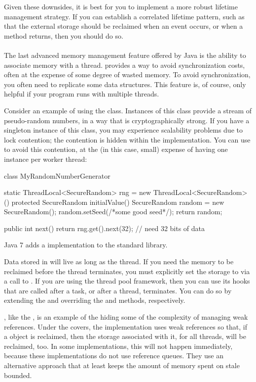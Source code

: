 Given these downsides, it is best for you to implement a more robust lifetime
management strategy. If you can establish a correlated lifetime pattern, such as
that the external storage should be reclaimed when an event occurs, or when a
method returns, then you should do so.

\paragraph{\TLS}
\tlsindex %

The last advanced memory management feature offered by Java is the ability to
associate memory with a thread. \Tls provides a way to avoid
synchronization costs, often at the expense of some degree of wasted memory. To
avoid synchronization, you often need to replicate some data structures. This
feature is, of course, only helpful if your program runs with multiple threads.

Consider an example of using the  class. Instances of this
class provide a stream of pseudo-random numbers, in a way that is
cryptographically strong. If you have a singleton instance of this class, you may
experience scalability problems due to lock contention; the contention is hidden
within the  implementation. You can use \tls
to avoid this contention, at the (in this case, small) expense of having one
instance per worker thread:
\begin{shortlisting}
class MyRandomNumberGenerator {
   static ThreadLocal<SecureRandom> rng = new ThreadLocal<SecureRandom>() {
      protected SecureRandom initialValue() {
         SecureRandom random = new SecureRandom();
         random.setSeed(/*some good seed*/);
         return random;
      }
   }
   
   public int next() {
      return rng.get().next(32); // need 32 bits of data
   }
}
\end{shortlisting} 
Java 7 adds a  implementation to the standard library.

Data stored in \tls will live as long as the thread. If you need
the memory to be reclaimed before the thread terminates, you must explicitly set
the storage to  via a call to . If you are using
the  thread pool framework, then you can use its
hooks that are called after a task, or after a thread, terminates. You can do so
by extending the  and overriding the
 and  methods, respectively.

\Tls, like the , is an example of the \jre hiding some of the
complexity of managing weak references. Under the covers, the \tls implementation
uses weak references so that, if a  object is reclaimed, then
the storage associated with it, for all threads, will be reclaimed, too. In some
implementations, this will not happen immediately, because these implementations
do not use reference queues. They use an alternative approach that at least
keeps the amount of memory spent on stale \tls bounded.
